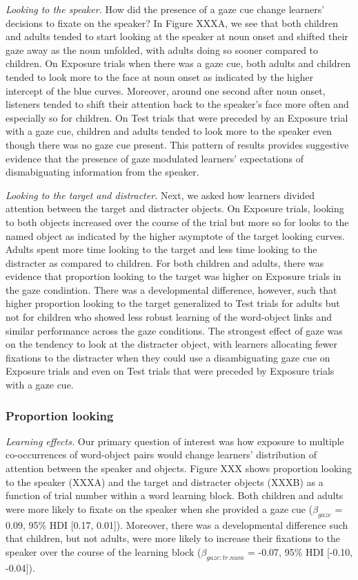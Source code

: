 \documentclass[man,floatsintext]{apa6}
\begin{document}
\emph{Looking to the speaker.} How did the presence of a gaze cue change
learners' decisions to fixate on the speaker? In Figure XXXA, we see
that both children and adults tended to start looking at the speaker at
noun onset and shifted their gaze away as the noun unfolded, with adults
doing so sooner compared to children. On Exposure trials when there was
a gaze cue, both adults and children tended to look more to the face at
noun onset as indicated by the higher intercept of the blue curves.
Moreover, around one second after noun onset, listeners tended to shift
their attention back to the speaker's face more often and especially so
for children. On Test trials that were preceded by an Exposure trial
with a gaze cue, children and adults tended to look more to the speaker
even though there was no gaze cue present. This pattern of results
provides suggestive evidence that the presence of gaze modulated
learners' expectations of dismabiguating information from the speaker.

\emph{Looking to the target and distracter.} Next, we asked how learners
divided attention between the target and distracter objects. On Exposure
trials, looking to both objects increased over the course of the trial
but more so for looks to the named object as indicated by the higher
asymptote of the target looking curves. Adults spent more time looking
to the target and less time looking to the distracter as compared to
children. For both children and adults, there was evidence that
proportion looking to the target was higher on Exposure trials in the
gaze condintion. There was a developmental difference, however, such
that higher proportion looking to the target generalized to Test trials
for adults but not for children who showed less robust learning of the
word-object links and similar performance across the gaze conditions.
The strongest effect of gaze was on the tendency to look at the
distracter object, with learners allocating fewer fixations to the
distracter when they could use a disambiguating gaze cue on Exposure
trials and even on Test trials that were preceded by Exposure trials
with a gaze cue.

\subsubsection{Proportion looking}\label{proportion-looking}

\emph{Learning effects.} Our primary question of interest was how
exposure to multiple co-occurrences of word-object pairs would change
learners' distribution of attention between the speaker and objects.
Figure XXX shows proportion looking to the speaker (XXXA) and the target
and distracter objects (XXXB) as a function of trial number within a
word learning block. Both children and adults were more likely to fixate
on the speaker when she provided a gaze cue (\(\beta_{gaze}\) = 0.09,
95\% HDI {[}0.17, 0.01{]}). Moreover, there was a developmental
difference such that children, but not adults, were more likely to
increase their fixations to the speaker over the course of the learning
block (\(\beta_{gaze:tr.num}\) = -0.07, 95\% HDI {[}-0.10, -0.04{]}).
\end{document}
